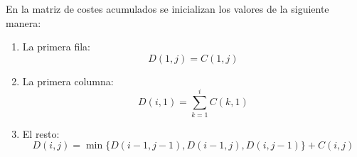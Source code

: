En la matriz de costes acumulados se inicializan los valores de la siguiente manera:
\begin{enumerate}
	\item  La primera fila:
	\begin{equation}
		D(1,j) = C(1,j)
	\end{equation}
	\item La primera columna:
	\begin{equation}
		D(i,1) = \sum_{k=1}^{i}C(k,1)
	\end{equation} 
	\item El resto:
	\begin{equation}
		D(i,j) = \min\{D(i-1, j-1),D(i-1,j),D(i,j-1)\} + C(i,j)
	\end{equation}
\end{enumerate}
